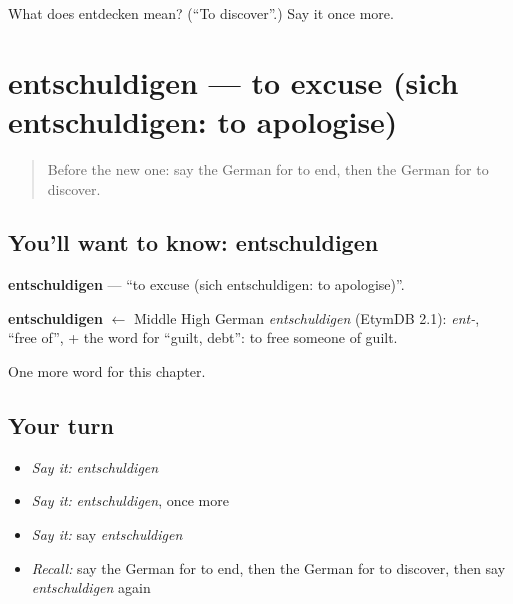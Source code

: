 \begin{tcolorbox}[breakable,colback=teal!4,colframe=teal!35!black,title={Before you move on}]
What does entdecken mean? (\textquotedblleft{}To discover\textquotedblright{}.) Say it once more.
\end{tcolorbox}
\section[entschuldigen]{entschuldigen — to excuse (sich entschuldigen: to apologise)}

\label{lesson:GE-C248-entschuldigen}



\begin{quote}
Before the new one: say the German for to end, then the German for to discover.
\end{quote}

\subsection*{You'll want to know: entschuldigen}
\textbf{entschuldigen} — \textquotedblleft{}to excuse (sich entschuldigen: to apologise)\textquotedblright{}.

\begin{cousinweb}
\textbf{entschuldigen} $\leftarrow$ Middle High German \emph{entschuldigen} (EtymDB 2.1): \emph{ent-}, \textquotedblleft{}free of\textquotedblright{}, + the word for \textquotedblleft{}guilt, debt\textquotedblright{}: to free someone of guilt.
\end{cousinweb}

\begin{grammarlens}[title={What you've built}]
One more word for this chapter.
\end{grammarlens}

\subsection*{Your turn}
\begin{itemize}
\raggedright
  \item \emph{Say it:} \emph{entschuldigen}
  \item \emph{Say it:} \emph{entschuldigen}, once more
  \item \emph{Say it:} say \emph{entschuldigen}
  \item \emph{Recall:} say the German for to end, then the German for to discover, then say \emph{entschuldigen} again
\end{itemize}

